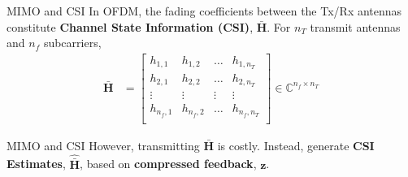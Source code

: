 \documentclass{beamer}
\newcommand{\fignocap}[2]{
	\begin{figure}[!hbtp]
	    \centering
		\texttt{[image: \#2]}
	\end{figure}
}
\begin{document}
	\begin{frame}{MIMO and CSI}
		In OFDM, the fading coefficients between the Tx/Rx antennas constitute \textbf{Channel State Information (CSI)}, $\bar{\mathbf{H}}$. For $n_T$ transmit antennas and $n_f$ subcarriers,
		\begin{align*}
			\bar{\mathbf{H}}&=\begin{bmatrix}
            							h_{1,1} & h_{1,2} & \dots  & h_{1,n_T} \\
            							h_{2,1} & h_{2,2} & \dots  & h_{2,n_T} \\
            							\vdots	& \vdots  & \vdots & \vdots    \\
            							h_{n_{f},1} & h_{n_{f},2} & \dots  & h_{n_{f},n_T} \\
            						\end{bmatrix}
                        \in \mathbb C^{n_f \times n_T}
		\end{align*}
	\end{frame}

  \begin{frame}{MIMO and CSI}
    However, transmitting $\bar{\mathbf{H}}$ is costly. Instead, generate \textbf{CSI Estimates}, $\hat{\bar{\mathbf{H}}}$, based on \textbf{compressed feedback}, $\mathbf z$.\\
    \vspace{24pt}
    \begin{figure}[!hbtp]
    \centering
    {
      \fontsize{4pt}{6pt}
      \def\svgwidth{0.9\columnwidth}
      
    }
    \end{figure}
  \end{frame}



\end{document}
